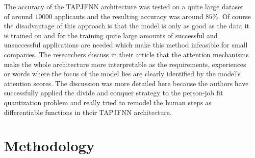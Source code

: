 \documentclass[draft,final]{thesisclass} %
\begin{document}
The accuracy of the \acs{TAPJFNN} architecture was tested on a quite large dataset of around $10000$ applicants and the resulting accuracy was around $85\%$.
Of course the disadvantage of this approach is that the model is only as good as the data it is trained on and for the training quite large amounts of successful and unsuccessful applications are needed which make this method infeasible for small companies.
The researchers discuss in their article that the attention mechanisms make the whole architecture more interpretable as the requirements, experiences or words where the focus of the model lies are clearly identified by the model's attention scores.
The discussion was more detailed here because the authors have successfully applied the divide and conquer strategy to the person-job fit quantization problem and really tried to remodel the human steps as differentiable functions in their \acs{TAPJFNN} architecture.

\chapter{Methodology} \label{methodology}
\end{document}
